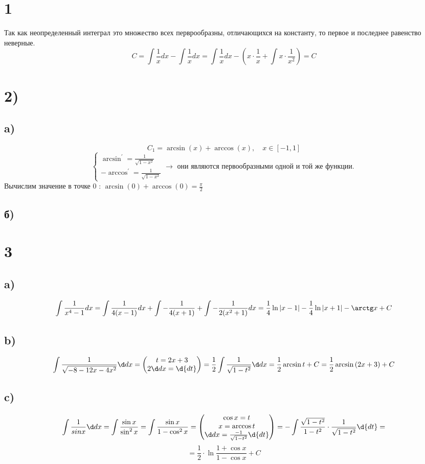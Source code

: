 

	\section*{1}
	Так как неопределенный интеграл это множество всех перврообразны, отличающихся на константу, то первое и последнее равенство неверные. \\
	$$C = \int\frac{1}{x}dx - \int\frac{1}{x}dx =\int\frac{1}{x}dx - \left(x\cdot \frac1x+ \int x\cdot\frac{1}{x^2}\right) = C $$
	\section*{2)}
	\subsection*{a)}
	$$C_1 = \arcsin(x) + \arccos(x) ,\quad x \in [-1,1]$$
	$$\begin{cases*}\arcsin^{'} = \frac{1}{\sqrt{1-x^2}}\\
	-\arccos^{'} =\frac{1}{\sqrt{1-x^2}} \end{cases*}\to \text{ они являются первообразными одной и той же функции. }$$
	Вычислим значение в точке 0 :
	$\arcsin(0) + \arccos(0) = \frac{\pi}{2}$
	\subsection*{б)}
	\section*{3}
	\subsection*{a)}
	$$\int \frac{1}{x^4-1}dx = \int\frac{1}{4(x-1)}dx+ \int - \frac{1}{4(x+1)} + \int-\frac{1}{2(x^2+1)}dx = \frac14\ln{|x-1|} - \frac14\ln{|x+1|} - \arctg x+ C$$
	\subsection*{b)}
	$$\int\frac{1}{\sqrt{-8-12x-4x^2}}\dx =\begin{pmatrix}
		t = 2x+3 \\
		2\dx =\d{dt}
		 
	\end{pmatrix} = \frac12\int\frac{1}{\sqrt{1-t^2}}\dx = \frac12\arcsin t + C  = \frac12\arcsin {(2x+3)} + C $$
	\subsection*{c)}
	 $$\int\frac{1}{sinx}\dx = \int\frac{\sin x}{\sin^2{x}} = \int\frac{\sin x}{1-\cos^2x} = \begin{pmatrix*}[c \cos x = t \\
	 	x = \arccos t\\
	 	\dx = \frac{-1}{\sqrt{1-t^2}}\d{dt}]\end{pmatrix*}= -\int\frac{\sqrt{1-t^2}}{1-t^2}\cdot\frac{1}{\sqrt{1-t^2}}\d{dt} =$$ $$= \frac12 \cdot \ln{\frac{1+\cos x}{1- \cos x}}+ C$$
